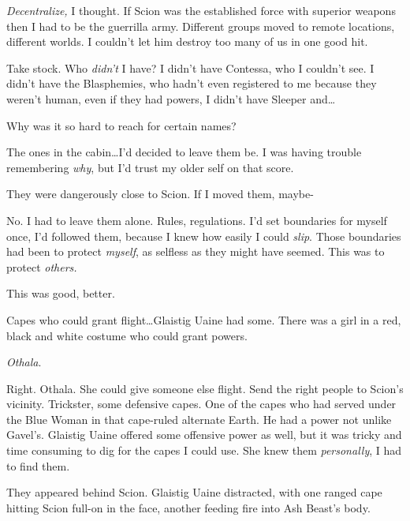 \emph{Decentralize, }I thought.\emph{  }If Scion was the established force with superior weapons then I had to be the guerrilla army.  Different groups moved to remote locations, different worlds.  I couldn't let him destroy too many of us in one good hit.



Take stock.  Who \emph{didn't} I have?  I didn't have Contessa, who I couldn't see.  I didn't have the Blasphemies, who hadn't even registered to me because they weren't human, even if they had powers, I didn't have Sleeper and\ldots



Why was it so hard to reach for certain names?



The ones in the cabin\ldots  I'd decided to leave them be.  I was having trouble remembering \emph{why}, but I'd trust my older self on that score.



They were dangerously close to Scion.  If I moved them, maybe-



No.  I had to leave them alone.  Rules, regulations.  I'd set boundaries for myself once, I'd followed them, because I knew how easily I could \emph{slip}.  Those boundaries had been to protect \emph{myself}, as selfless as they might have seemed.  This was to protect \emph{others.}



This was good, better.



Capes who could grant flight\ldots Glaistig Uaine had some.  There was a girl in a red, black and white costume who could grant powers.



\emph{Othala}.



Right.  Othala.  She could give someone else flight.  Send the right people to Scion's vicinity.  Trickster, some defensive capes.  One of the capes who had served under the Blue Woman in that cape-ruled alternate Earth.  He had a power not unlike Gavel's.  Glaistig Uaine offered some offensive power as well, but it was tricky and time consuming to dig for the capes I could use.  She knew them \emph{personally}, I had to find them.



They appeared behind Scion.  Glaistig Uaine distracted, with one ranged cape hitting Scion full-on in the face, another feeding fire into Ash Beast's body.



